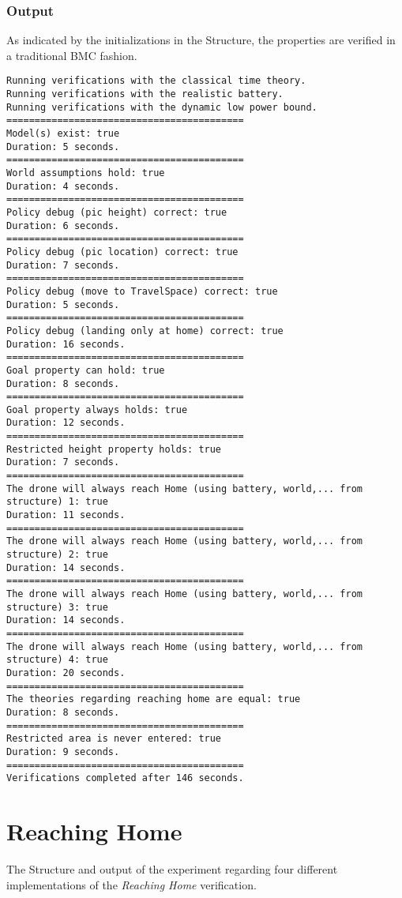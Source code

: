 \documentclass[12pt]{extarticle}
\begin{document}
\subsubsection*{Output}
As indicated by the initializations in the Structure, the properties are verified in a traditional BMC fashion.
\begin{lstlisting}[basicstyle=\tiny]
Running verifications with the classical time theory.
Running verifications with the realistic battery.
Running verifications with the dynamic low power bound.
==========================================
Model(s) exist: true
Duration: 5 seconds.
==========================================
World assumptions hold: true
Duration: 4 seconds.
==========================================
Policy debug (pic height) correct: true
Duration: 6 seconds.
==========================================
Policy debug (pic location) correct: true
Duration: 7 seconds.
==========================================
Policy debug (move to TravelSpace) correct: true
Duration: 5 seconds.
==========================================
Policy debug (landing only at home) correct: true
Duration: 16 seconds.
==========================================
Goal property can hold: true
Duration: 8 seconds.
==========================================
Goal property always holds: true
Duration: 12 seconds.
==========================================
Restricted height property holds: true
Duration: 7 seconds.
==========================================
The drone will always reach Home (using battery, world,... from structure) 1: true
Duration: 11 seconds.
==========================================
The drone will always reach Home (using battery, world,... from structure) 2: true
Duration: 14 seconds.
==========================================
The drone will always reach Home (using battery, world,... from structure) 3: true
Duration: 14 seconds.
==========================================
The drone will always reach Home (using battery, world,... from structure) 4: true
Duration: 20 seconds.
==========================================
The theories regarding reaching home are equal: true
Duration: 8 seconds.
==========================================
Restricted area is never entered: true
Duration: 9 seconds.
==========================================
Verifications completed after 146 seconds.
\end{lstlisting}

\section{Reaching Home}
\label{app:struc-reaching-home}
The Structure and output of the experiment regarding four different implementations of the \textit{Reaching Home} verification.
\end{document}
